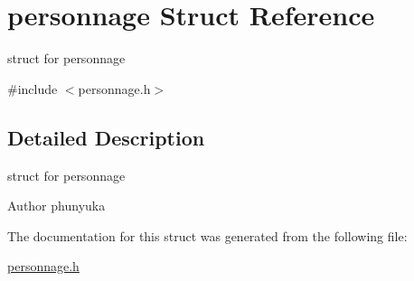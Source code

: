\hypertarget{structpersonnage}{}\section{personnage Struct Reference}
\label{structpersonnage}


struct for personnage  




{\ttfamily \#include $<$personnage.\+h$>$}



\subsection{Detailed Description}
struct for personnage 

\begin{DoxyAuthor}{Author}
phunyuka 
\end{DoxyAuthor}


The documentation for this struct was generated from the following file\+:\begin{DoxyCompactItemize}
\item 
\hyperlink{personnage_8h}{personnage.\+h}\end{DoxyCompactItemize}
